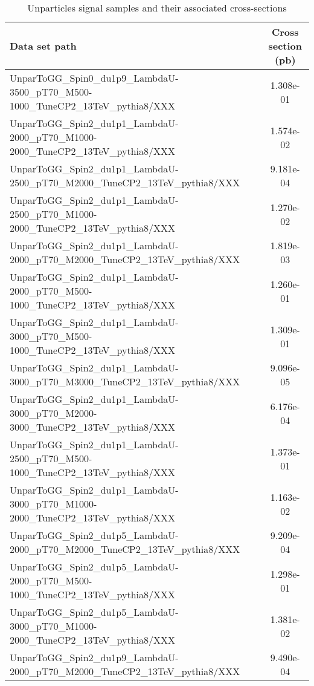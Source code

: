 \begin{landscape}
\begin{table}[!htbp]
       \caption{ Unparticles signal samples and their associated cross-sections }
       \centering
       \vspace{\baselineskip}
       \begin{tabular}{lc}
       \hline \hline
       Data set path & Cross section (pb)\\
       \hline

       UnparToGG\_Spin0\_du1p9\_LambdaU-3500\_pT70\_M500-1000\_TuneCP2\_13TeV\_pythia8/XXX & 1.308e-01\\
       UnparToGG\_Spin2\_du1p1\_LambdaU-2000\_pT70\_M1000-2000\_TuneCP2\_13TeV\_pythia8/XXX & 1.574e-02\\
       UnparToGG\_Spin2\_du1p1\_LambdaU-2500\_pT70\_M2000\_TuneCP2\_13TeV\_pythia8/XXX & 9.181e-04\\
       UnparToGG\_Spin2\_du1p1\_LambdaU-2500\_pT70\_M1000-2000\_TuneCP2\_13TeV\_pythia8/XXX & 1.270e-02\\
       UnparToGG\_Spin2\_du1p1\_LambdaU-2000\_pT70\_M2000\_TuneCP2\_13TeV\_pythia8/XXX & 1.819e-03\\
       UnparToGG\_Spin2\_du1p1\_LambdaU-2000\_pT70\_M500-1000\_TuneCP2\_13TeV\_pythia8/XXX & 1.260e-01\\
       UnparToGG\_Spin2\_du1p1\_LambdaU-3000\_pT70\_M500-1000\_TuneCP2\_13TeV\_pythia8/XXX & 1.309e-01\\
       UnparToGG\_Spin2\_du1p1\_LambdaU-3000\_pT70\_M3000\_TuneCP2\_13TeV\_pythia8/XXX & 9.096e-05\\
       UnparToGG\_Spin2\_du1p1\_LambdaU-3000\_pT70\_M2000-3000\_TuneCP2\_13TeV\_pythia8/XXX & 6.176e-04\\
       UnparToGG\_Spin2\_du1p1\_LambdaU-2500\_pT70\_M500-1000\_TuneCP2\_13TeV\_pythia8/XXX & 1.373e-01\\
       UnparToGG\_Spin2\_du1p1\_LambdaU-3000\_pT70\_M1000-2000\_TuneCP2\_13TeV\_pythia8/XXX & 1.163e-02\\
       UnparToGG\_Spin2\_du1p5\_LambdaU-2000\_pT70\_M2000\_TuneCP2\_13TeV\_pythia8/XXX & 9.209e-04\\
       UnparToGG\_Spin2\_du1p5\_LambdaU-2000\_pT70\_M500-1000\_TuneCP2\_13TeV\_pythia8/XXX & 1.298e-01\\
       UnparToGG\_Spin2\_du1p5\_LambdaU-3000\_pT70\_M1000-2000\_TuneCP2\_13TeV\_pythia8/XXX & 1.381e-02\\
       UnparToGG\_Spin2\_du1p9\_LambdaU-2000\_pT70\_M2000\_TuneCP2\_13TeV\_pythia8/XXX & 9.490e-04\\

\end{tabular}
\end{table}
\end{landscape}
